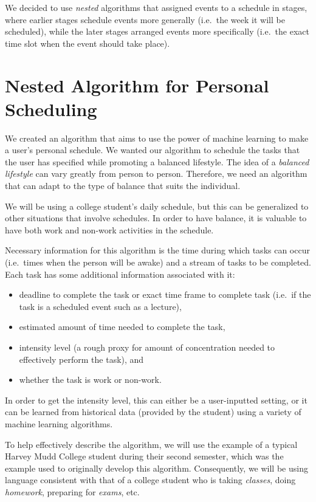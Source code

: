 \documentclass{article}
\begin{document}
	We decided to use \emph{nested} algorithms that assigned events to a schedule in stages, where earlier stages schedule events more generally (i.e.~the week it will be scheduled), while the later stages arranged events more specifically (i.e.~the exact time slot when the event should take place).

\section{Nested Algorithm for Personal Scheduling}
	We created an algorithm that aims to use the power of machine learning to make a user's personal schedule.
	We wanted our algorithm to schedule the tasks that the user has specified while promoting a balanced lifestyle.
	The idea of a \emph{balanced lifestyle} can vary greatly from person to person.
	Therefore, we need an algorithm that can adapt to the type of balance that suits the individual.

	We will be using a college student's daily schedule, but this can be generalized to other situations that involve schedules.
	In order to have balance, it is valuable to have both work and non-work activities in the schedule.

	Necessary information for this algorithm is the time during which tasks can occur (i.e.~times when the person will be awake) and a stream of tasks to be completed.
	Each task has some additional information associated with it:
	\begin{itemize}
		\item deadline to complete the task or exact time frame to complete task (i.e.~if the task is a scheduled event such as a lecture),
		\item estimated amount of time needed to complete the task,
		\item intensity level (a rough proxy for amount of concentration needed to effectively perform the task), and
		\item whether the task is work or non-work.
	\end{itemize}
	In order to get the intensity level, this can either be a user-inputted setting, or it can be learned from historical data (provided by the student) using a variety of machine learning algorithms.

	To help effectively describe the algorithm, we will use the example of a typical Harvey Mudd College student during their second semester, which was the example used to originally develop this algorithm.
	Consequently, we will be using language consistent with that of a college student who is taking \emph{classes}, doing \emph{homework}, preparing for \emph{exams}, etc.
\end{document}
